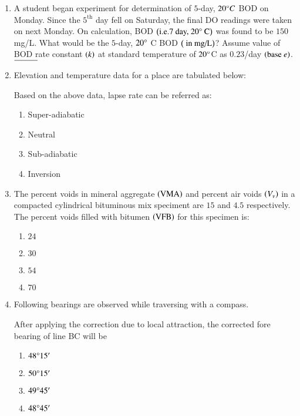 \documentclass[journal,onecolumn]{IEEEtran}
\theoremstyle{remark}
\begin{document}
\begin{enumerate}
    \item A student began experiment for determination of $5$-day, $20\degree C$ BOD on Monday. Since the $5^{\text{th}}$ day fell on Saturday, the final DO readings were taken on next Monday. On calculation, BOD $\left(\text{i.e.} 7 \text{ day, } 20\degree \text{ C}\right)$ was found to be $150$ mg/L. What would be the $5$-day, $20\degree$ C BOD $\left(\text{ in mg/L}\right)$? Assume value of BOD rate constant $\left(k\right)$ at standard temperature of $20\degree$C as $0.23$/day $\left(\text{base } e\right)$. $\rule{1cm}{0.15mm}$ 

    \item Elevation and temperature data for a place are tabulated below:
	\begin{table}[h!]
		\centering
		
		\label{taba1.q44}
	\end{table}
	Based on the above data, lapse rate can be referred as:

	\begin{enumerate}
		\item Super-adiabatic
		\item Neutral
		\item Sub-adiabatic
		\item Inversion
	\end{enumerate}

    \item The percent voids in mineral aggregate $\left(\text{VMA}\right)$ and percent air voids $\left(V_v\right)$ in a compacted cylindrical bituminous mix speciment are $15$ and $4.5$ respectively. The percent voids filled with bitumen $\left(\text{VFB}\right)$ for this specimen is:
	\begin{enumerate}
		\item $24$
		\item $30$
		\item $54$
		\item $70$
	\end{enumerate}


    \item Following bearings are observed while traversing with a compass.
	\begin{table}[h!]
		\centering
		
		\label{taba1.q46}
	\end{table}
	After applying the correction due to local attraction, the corrected fore bearing of line BC will be

	\begin{enumerate}
		\item $48\degree 15^{\prime}$
		\item $50\degree 15^{\prime}$
		\item $49\degree 45^{\prime}$
		\item $48\degree 45^{\prime}$
	\end{enumerate}


\end{enumerate}
\end{document}
